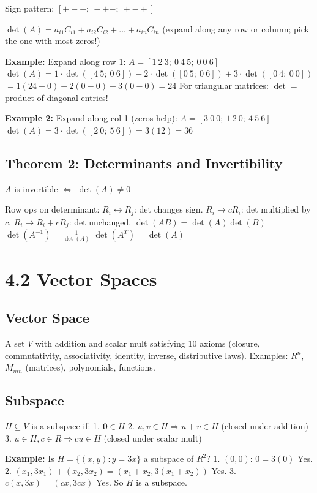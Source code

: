 Sign pattern: $[+ - +;\ - + -;\ + - +]$

$\det(A) = a_{i1}C_{i1} + a_{i2}C_{i2} + ... + a_{in}C_{in}$
(expand along any row or column; pick the one with most zeros!)

\textbf{Example:} Expand along row 1:
$A = [1\ 2\ 3;\ 0\ 4\ 5;\ 0\ 0\ 6]$
$\det(A) = 1 \cdot \det([4\ 5;\ 0\ 6]) - 2 \cdot \det([0\ 5;\ 0\ 6]) + 3 \cdot \det([0\ 4;\ 0\ 0])$
$= 1(24-0) - 2(0-0) + 3(0-0) = 24$
For triangular matrices: $\det = $ product of diagonal entries!

\textbf{Example 2:} Expand along col 1 (zeros help):
$A = [3\ 0\ 0;\ 1\ 2\ 0;\ 4\ 5\ 6]$
$\det(A) = 3 \cdot \det([2\ 0;\ 5\ 6]) = 3(12) = 36$

\subsection{Theorem 2: Determinants and Invertibility}
$A$ is invertible $\Leftrightarrow$ $\det(A) \neq 0$

Row ops on determinant:
$R_i \leftrightarrow R_j$: det changes sign.
$R_i \to cR_i$: det multiplied by $c$.
$R_i \to R_i + cR_j$: det unchanged.
$\det(AB) = \det(A)\det(B)$
$\det(A^{-1}) = \frac{1}{\det(A)}$
$\det(A^T) = \det(A)$

\section{4.2 Vector Spaces}

\subsection{Vector Space}
A set $V$ with addition and scalar mult satisfying 10 axioms
(closure, commutativity, associativity, identity, inverse, distributive laws).
Examples: $R^n$, $M_{mn}$ (matrices), polynomials, functions.

\subsection{Subspace}
$H \subseteq V$ is a subspace if:
1. $\mathbf{0} \in H$
2. $u, v \in H \Rightarrow u + v \in H$ (closed under addition)
3. $u \in H, c \in R \Rightarrow cu \in H$ (closed under scalar mult)

\textbf{Example:} Is $H = \{(x, y) : y = 3x\}$ a subspace of $R^2$?
1. $(0,0)$: $0 = 3(0)$ Yes.
2. $(x_1, 3x_1) + (x_2, 3x_2) = (x_1+x_2, 3(x_1+x_2))$ Yes.
3. $c(x, 3x) = (cx, 3cx)$ Yes.
So $H$ is a subspace.

